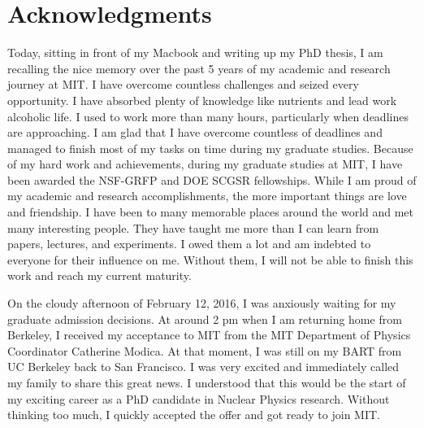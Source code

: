 \cleardoublepage
\setcounter{savepage}{\thepage}
\begin{abstractpage}

\end{abstractpage}

% 

\cleardoublepage

\section*{Acknowledgments}


Today, sitting in front of my Macbook and writing up my PhD thesis, I am recalling the nice memory over the past 5 years of my academic and research journey at MIT. I have overcome countless challenges and seized every opportunity. I have absorbed plenty of knowledge like nutrients and lead work alcoholic life. I used to work more than many hours, particularly when deadlines are approaching. I am glad that I have overcome countless of deadlines and managed to finish most of my tasks on time during my graduate studies. Because of my hard work and achievements, during my graduate studies at MIT, I have been awarded the NSF-GRFP and DOE SCGSR fellowships. While I am proud of my academic and research accomplishments, the more important things are love and friendship. I have been to many memorable places around the world and met many interesting people. They have taught me more than I can learn from papers, lectures, and experiments. I owed them a lot and am indebted to everyone for their influence on me. Without them, I will not be able to finish this work and reach my current maturity.

On the cloudy afternoon of February 12, 2016, I was anxiously waiting for my graduate admission decisions. At around 2 pm when I am returning home from Berkeley, I received my acceptance to MIT from the MIT Department of Physics Coordinator Catherine Modica. At that moment, I was still on my BART from UC Berkeley back to San Francisco. I was very excited and immediately called my family to share this great news. I understood that this would be the start of my exciting career as a PhD candidate in Nuclear Physics research. Without thinking too much, I quickly accepted the offer and got ready to join MIT.

